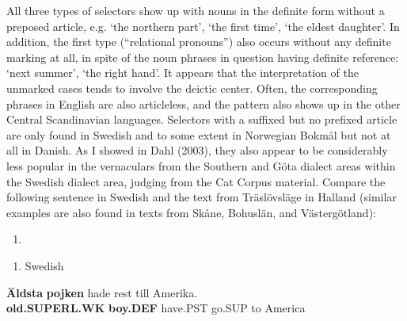 All three types of selectors show up with nouns in the definite form without a preposed article, e.g.  ‘the northern part’,  ‘the first time’,  ‘the eldest daughter’. In addition, the first type (“relational pronouns”) also occurs without any definite marking at all, in spite of the noun phrases in question having definite reference:  ‘next summer’,  ‘the right hand’. It appears that the interpretation of the unmarked cases tends to involve the deictic center. Often, the corresponding phrases in English are also articleless, and the pattern also shows up in the other Central Scandinavian languages. Selectors with a suffixed but no prefixed article are only found in Swedish and to some extent in Norwegian Bokmål but not at all in Danish. As I showed in Dahl (2003), they also appear to be considerably less popular in the vernaculars from the Southern and Göta dialect areas within the Swedish dialect area, judging from the Cat Corpus material. Compare the following sentence in Swedish and the text from Träslövsläge in Halland (similar examples are also found in texts from Skåne, Bohuslän, and Västergötland):

\begin{enumerate} %
\item 
\end{enumerate} %
\setcounter{listLFOxcviiileveli}{0}
\begin{enumerate} %
\item 
Swedish

\end{enumerate} %
\ea\label{}
\gll \textbf{Äldsta} \textbf{pojken} hade  rest  till  Amerika.\\


\textbf{old.SUPERL.WK} \textbf{boy.DEF} have.PST  go.SUP  to  America\\ %


